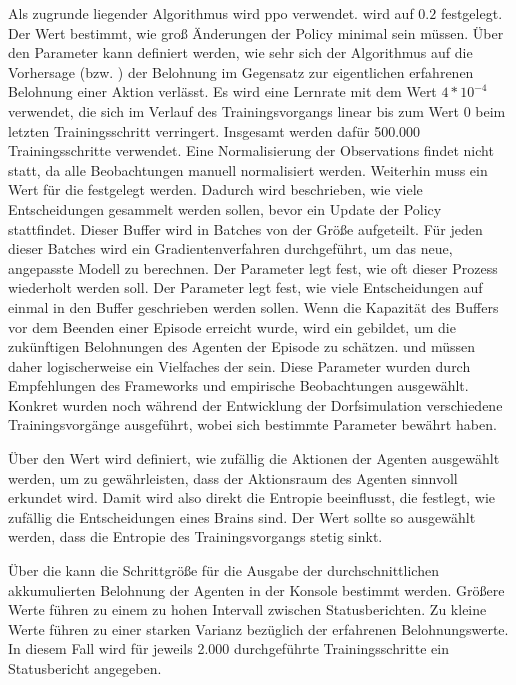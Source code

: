 Als zugrunde liegender Algorithmus wird \ac{ppo} verwendet.  wird auf $ 0.2 $ festgelegt. Der Wert bestimmt, wie groß Änderungen der Policy minimal sein müssen. Über den Parameter  kann definiert werden, wie sehr sich der Algorithmus auf die Vorhersage (bzw. ) der Belohnung im Gegensatz zur eigentlichen erfahrenen Belohnung einer Aktion verlässt. Es wird eine Lernrate mit dem Wert $4 * 10^{-4}$ verwendet, die sich im Verlauf des Trainingsvorgangs linear bis zum Wert $0$ beim letzten Trainingsschritt verringert. Insgesamt werden dafür 500.000 Trainingsschritte verwendet. Eine Normalisierung der Observations findet nicht statt, da alle Beobachtungen manuell normalisiert werden.
Weiterhin muss ein Wert für die  festgelegt werden. Dadurch wird beschrieben, wie viele Entscheidungen gesammelt werden sollen, bevor ein Update der Policy stattfindet. Dieser Buffer wird in Batches von der Größe  aufgeteilt. Für jeden dieser Batches wird ein Gradientenverfahren durchgeführt, um das neue, angepasste Modell zu berechnen. Der Parameter  legt fest, wie oft dieser Prozess wiederholt werden soll. Der Parameter  legt fest, wie viele Entscheidungen auf einmal in den Buffer geschrieben werden sollen. Wenn die Kapazität des Buffers vor dem Beenden einer Episode erreicht wurde, wird ein  gebildet, um die zukünftigen Belohnungen des Agenten der Episode zu schätzen.  und  müssen daher logischerweise ein Vielfaches der  sein. Diese Parameter wurden durch Empfehlungen des Frameworks und empirische Beobachtungen ausgewählt. Konkret wurden noch während der Entwicklung der Dorfsimulation verschiedene Trainingsvorgänge ausgeführt, wobei sich bestimmte Parameter bewährt haben.

Über den Wert  wird definiert, wie zufällig die Aktionen der Agenten ausgewählt werden, um zu gewährleisten, dass der Aktionsraum des Agenten sinnvoll erkundet wird. Damit wird also direkt die Entropie beeinflusst, die festlegt, wie zufällig die Entscheidungen eines Brains sind. Der Wert sollte so ausgewählt werden, dass die Entropie des Trainingsvorgangs stetig sinkt.

Über die  kann die Schrittgröße für die Ausgabe der durchschnittlichen akkumulierten Belohnung der Agenten in der Konsole bestimmt werden. Größere Werte führen zu einem zu hohen Intervall zwischen Statusberichten. Zu kleine Werte führen zu einer starken Varianz bezüglich der erfahrenen Belohnungswerte. In diesem Fall wird für jeweils 2.000 durchgeführte Trainingsschritte ein Statusbericht angegeben. 

